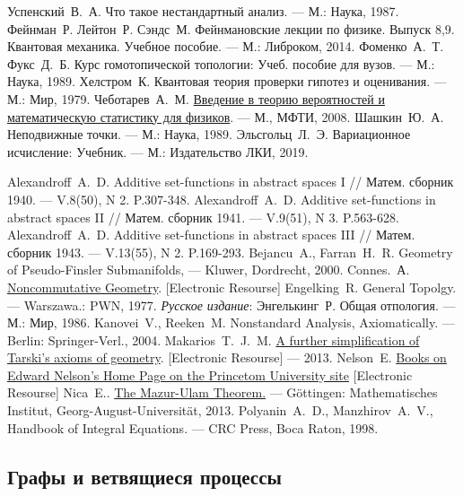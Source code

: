 \begin{thebibliography}{199}
 Успенский~В.~А. Что такое нестандартный анализ. --- М.: Наука, 1987.
 Фейнман~Р. Лейтон~Р. Сэндс~М. Фейнмановские лекции по физике. Выпуск 8,9. Квантовая механика. Учебное пособие. --- М.: Либроком, 2014.
 Фоменко~А.~Т. Фукс~Д.~Б. Курс гомотопической топологии: Учеб. пособие для вузов. --- М.: Наука, 1989.
 Хелстром~К. Квантовая теория проверки гипотез и оценивания. --- М.: Мир, 1979.
 Чеботарев~А.~М. \href{http://test.nccse.ru/bayane/books/chebotarev_probabtheor.pdf}{Введение в теорию вероятностей и математическую статистику для физиков}. --- М., МФТИ, 2008.
 Шашкин~Ю.~А. Неподвижные точки. --- М.: Наука, 1989.
 Эльсгольц~Л.~Э. Вариационное исчисление: Учебник. --- М.: Издательство ЛКИ, 2019.

 Alexandroff~A.~D. Additive set-functions in abstract spaces I // Матем. сборник 1940. --- V.8(50), N 2. P.307-348.
 Alexandroff~A.~D. Additive set-functions in abstract spaces II // Матем. сборник 1941. --- V.9(51), N 3. P.563-628.
 Alexandroff~A.~D. Additive set-functions in abstract spaces III // Матем. сборник 1943. --- V.13(55), N 2. P.169-293.
 Bejancu~A., Farran~H.~R. Geometry of Pseudo-Finsler Submanifolds, --- Kluwer, Dordrecht, 2000.
 Connes.~А. \href{http://www.alainconnes.org/docs/book94bigpdf.pdf}{Noncommutative Geometry}. [Electronic Resourse]
 Engelking~R. General Topolgy. --- Warszawa.: PWN, 1977. \textit{Русское издание}: Энгелькинг~Р. Общая отпология. --- М.: Мир, 1986.
 Kanovei~V., Reeken~M. Nonstandard Analysis, Axiomatically. --- Berlin: Springer-Verl., 2004.
 Makarios~T.~J.~M. \href{https://arxiv.org/pdf/1306.0066.pdf}{A further simplification of Tarski’s axioms of geometry}. [Electronic Resourse] --- 2013.
 Nelson~E. \href{https://web.math.princeton.edu/~nelson/books.html}{Books on Edward Nelson's Home Page on the Princetom University site} [Electronic Resourse]
 Nica~E.. \href{https://arxiv.org/pdf/1306.2380.pdf}{The Mazur-Ulam Theorem.} --- G\"ottingen: Mathematisches Institut, Georg-August-Universit\"at, 2013.
 Polyanin~A.~D., Manzhirov~A.~V., Handbook of Integral Equations. --- CRC Press, Boca Raton, 1998.


\subsection*{Графы и ветвящиеся процессы}


\end{thebibliography}
